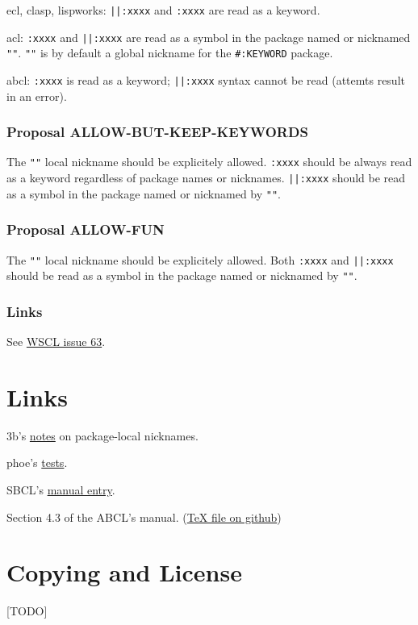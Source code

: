 \documentclass[11pt]{article}
\begin{document}
ecl, clasp, lispworks:
\texttt{||:xxxx} and \texttt{:xxxx} are read as a keyword.

acl:
\texttt{:xxxx} and \texttt{||:xxxx} are read as a symbol in the package named or nicknamed \texttt{""}.
\texttt{""} is by default a global nickname for the \texttt{\#:KEYWORD} package.

abcl:
\texttt{:xxxx} is read as a keyword;
\texttt{||:xxxx} syntax cannot be read (attemts result in an error).
\subsubsection{Proposal ALLOW-BUT-KEEP-KEYWORDS}
\label{sec:orgfa2a433}
The \texttt{""} local nickname should be explicitely allowed. \texttt{:xxxx} should be always
read as a keyword regardless of package names or nicknames. \texttt{||:xxxx} should be
read as a symbol in the package named or nicknamed by \texttt{""}.
\subsubsection{Proposal ALLOW-FUN}
\label{sec:orgb0d7265}
The \texttt{""} local nickname should be explicitely allowed. Both \texttt{:xxxx} and \texttt{||:xxxx}
should be read as a symbol in the package named or nicknamed by \texttt{""}.
\subsubsection{Links}
\label{sec:orgab1a08e}
See \href{https://github.com/s-expressionists/wscl/issues/63}{WSCL issue 63}.
\section{Links}
\label{sec:orge268f2b}
3b's \href{https://github.com/3b/package-local-nicknames/blob/master/docs.org}{notes} on package-local nicknames.

phoe's \href{https://github.com/phoe/trivial-package-local-nicknames}{tests}.

SBCL's \href{https://www.sbcl.org/manual/\#Package\_002dLocal-Nicknames}{manual entry}.

Section 4.3 of the ABCL's manual. (\href{https://github.com/armedbear/abcl/blob/master/doc/manual/abcl.tex\#L1249}{\TeX{} file on github})
\section{Copying and License}
\label{sec:orgdf25b15}
[TODO]
\end{document}
